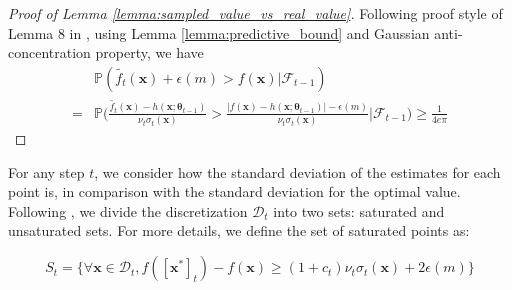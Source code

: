 \begin{proof}[Proof of Lemma \ref{lemma:sampled_value_vs_real_value}]
    Following proof style of Lemma 8 in \citet{zhou2020neural}, using Lemma \ref{lemma:predictive_bound} and Gaussian anti-concentration property, we have 
\begin{equation*}
    \begin{split}
        & \mathbb{P}(\widetilde{f_t}(\mathbf{x}) + \epsilon(m) > f(\mathbf{x}) \lvert \mathcal{F}_{t-1}) \\
        = & \mathbb{P} \Bigg(\frac{\widetilde{f_t}(\mathbf{x}) - h(\mathbf{x}; \boldsymbol{\theta}_{t-1}) }{\nu_t \sigma_t(\mathbf{x})} >   \frac{ \lvert f(\mathbf{x}) - h(\mathbf{x}; \boldsymbol{\theta}_{t-1}) \rvert - \epsilon(m) }{\nu_t \sigma_t(\mathbf{x})}  \Bigg \lvert \mathcal{F}_{t-1} \Bigg) \geq \frac{1}{4e\pi}
    \end{split}
\end{equation*}
\end{proof}




For any step $t$, we consider how the standard deviation of the estimates for each point is, in comparison with the standard deviation for the optimal value.
Following \cite{zhang2021neural}, we divide the discretization $\mathcal D_t$ into two sets: saturated and unsaturated sets. For more details, we define the set of saturated points as:

\begin{equation}
\label{def:saturated_set}
S_t = \{\forall \mathbf{x} \in \mathcal{D}_t, f([\mathbf{x}^*]_t) - f(\mathbf{x}) \geq (1+c_t)\nu_t \sigma_t(\mathbf{x})+ 2\epsilon(m)\}
\end{equation}




